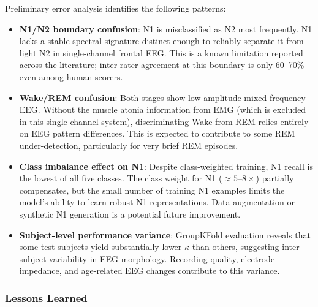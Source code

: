 \documentclass[10pt]{article}
\begin{document}
Preliminary error analysis identifies the following patterns:

\begin{itemize}
  \item \textbf{N1/N2 boundary confusion}: N1 is misclassified as N2 most frequently. N1 lacks a stable spectral signature distinct enough to reliably separate it from light N2 in single-channel frontal EEG. This is a known limitation reported across the literature; inter-rater agreement at this boundary is only 60--70\% even among human scorers.

  \item \textbf{Wake/REM confusion}: Both stages show low-amplitude mixed-frequency EEG. Without the muscle atonia information from EMG (which is excluded in this single-channel system), discriminating Wake from REM relies entirely on EEG pattern differences.  This is expected to contribute to some REM under-detection, particularly for very brief REM episodes.

  \item \textbf{Class imbalance effect on N1}: Despite class-weighted training, N1 recall is the lowest of all five classes. The class weight for N1 ($\approx 5$--$8\times$) partially compensates, but the small number of training N1 examples limits the model's ability to learn robust N1 representations. Data augmentation or synthetic N1 generation is a potential future improvement.

  \item \textbf{Subject-level performance variance}: GroupKFold evaluation reveals that some test subjects yield substantially lower $\kappa$ than others, suggesting inter-subject variability in EEG morphology. Recording quality, electrode impedance, and age-related EEG changes contribute to this variance.
\end{itemize}

\subsubsection{Lessons Learned}
\label{sec:lessonsLearned}
\end{document}
